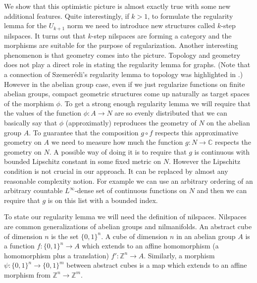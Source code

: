 \documentclass [11pt] {article}
\begin{document}
We show that this optimistic picture is almost exactly true with some new additional features.
Quite interestingly, if $k>1$, to formulate the regularity lemma for the $U_{k+1}$ norm we need to introduce new structures called $k$-step nilspaces. It turns out that $k$-step nilspaces are forming a category and the morphisms are suitable for the purpose of regularization. 
Another interesting phenomenon is that geometry comes into the picture.
Topology and geometry does not play a direct role in stating the regularity lemma for graphs. (Note that a connection of Szemer\'edi's regularity lemma to topology was highlighted in \cite{LSz4}.) However in the abelian group case, even if we just regularize functions on finite abelian groups, compact geometric structures come up naturally as target spaces of the morphism $\phi$. To get a strong enough regularity lemma we will require that the values of the function $\phi:A\rightarrow N$ are so evenly distributed that we can basically say that $\phi$ (approximatly) reproduces the geometry of $N$ on the abelian group $A$. To guarantee that the composition $g\circ f$ respects this approximative geometry on $A$ we need to measure how much the function $g:N\rightarrow\mathbb{C}$ respects the geometry on $N$.
A possible way of doing it is to require that $g$ is continuous with bounded Lipschitz constant in some fixed metric on $N$. However the Lipschitz condition is not crucial in our approach. It can be replaced by almost any reasonable complexity notion. For example we can use an arbitrary ordering of an arbitrary countable $L^\infty$-dense set of continuous functions on $N$ and then we can require that $g$ is on this list with a bounded index.
  
\bigskip

To state our regularity lemma we will need the definition of nilspaces.
Nilspaces are common generalizations of abelian groups and nilmanifolds.
An abstract cube of dimension $n$ is the set $\{0,1\}^n$.
A cube of dimension $n$ in an abelian group $A$ is a function $f:\{0,1\}^n\rightarrow A$ which extends to an affine homomorphism (a homomorphism plus a translation) $f':\mathbb{Z}^n\rightarrow A$. Similarly, a morphism $\psi:\{0,1\}^n\rightarrow\{0,1\}^m$ between abstract cubes is a map which extends to an affine morphism from $\mathbb{Z}^n\rightarrow\mathbb{Z}^m$.
\end{document}
